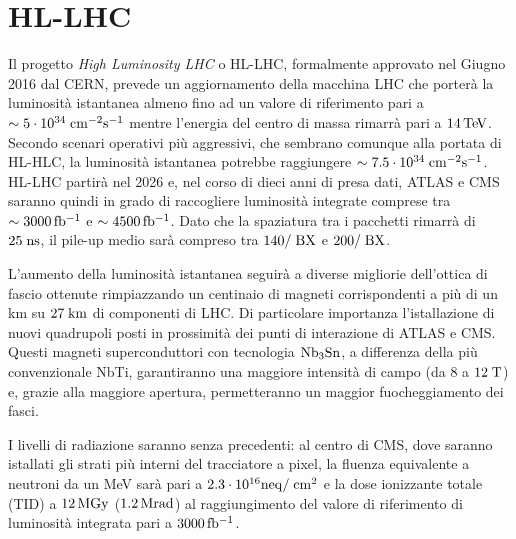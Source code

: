 \section{HL-LHC}
Il progetto {\em High Luminosity LHC} o HL-LHC, formalmente approvato nel Giugno 2016 dal CERN, prevede un aggiornamento della macchina LHC che porter\`a la luminosit\`a istantanea almeno fino ad un valore di riferimento pari a $\sim \nobreak 5\cdot10^{34}\rm \; cm^{-2}{\mathrm s}^{-1}$ mentre l'energia del centro di massa rimarr\`a pari a $14{\rm \, Te\kern-0.125em V}$. 
Secondo scenari operativi pi\`u aggressivi, che sembrano comunque alla portata di HL-HLC, la luminosit\`a istantanea potrebbe raggiungere $\sim \nobreak  7.5\cdot10^{34}\rm \; cm^{-2}{\mathrm s}^{-1}$. HL-LHC partir\`a nel 2026 e, nel corso di dieci anni di presa dati, ATLAS e CMS saranno quindi in grado di raccogliere luminosit\`a integrate comprese tra $\sim3000{\rm \, fb^{-1}}$ e $\sim4500{\rm \, fb^{-1}}$. Dato che la spaziatura tra i pacchetti rimarr\`a di $25\rm \; ns$, il pile-up medio sar\`a compreso tra $140/\rm \; BX$ e $200/\rm \; BX$.

L'aumento della luminosit\`a istantanea seguir\`a a diverse migliorie dell'ottica di fascio ottenute rimpiazzando un centinaio di magneti corrispondenti a pi\`u di un km su $27\rm \; km$ di componenti di LHC. Di particolare importanza l'istallazione di nuovi quadrupoli posti in prossimit\`a dei punti di interazione di ATLAS e CMS. Questi magneti superconduttori con tecnologia ${\rm Nb_3Sn}$, a differenza della pi\`u convenzionale NbTi, garantiranno una maggiore intensit\`a di campo (da 8 a $12\rm \; T$) e, grazie alla maggiore apertura, permetteranno un maggior fuocheggiamento dei fasci. 

I livelli di radiazione saranno senza precedenti: al centro di CMS, dove saranno istallati gli strati pi\`u interni del tracciatore a pixel, la fluenza equivalente a neutroni da un MeV sar\`a pari a $2.3\cdot 10^{16} {\rm neq}/\rm \; cm^2$ e la dose ionizzante totale (TID) a $12{\rm \, MGy}$ ($1.2{\rm \, Mrad}$) al raggiungimento del valore di riferimento di luminosit\`a integrata pari a $3000{\rm \, fb^{-1}}$.

